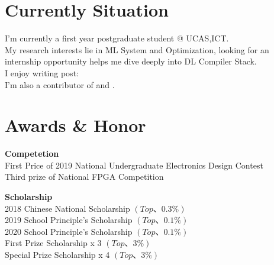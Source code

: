 \documentclass[a4paper,10pt]{article}
\begin{document}
\begin{adjustbox}{valign=t}
\begin{minipage}{0.6\textwidth} %
\section*{Currently Situation}
\begin{description}
	\raggedright
	\item I'm currently a first year postgraduate student @ UCAS,ICT.\\
	My research interests lie in ML System and Optimization, looking for an internship opportunity helps me dive deeply into DL Compiler Stack. \\
	I enjoy writing post: \\
	I'm also a contributor of  and .

\end{description}

\section*{Awards \& Honor}
\begin{description}
\raggedright
\item [] \textbf{Competetion} \\
	First Price of 2019 National Undergraduate Electronics Design Contest \\
	Third prize of National FPGA Competition \\
	\item [] \textbf{Scholarship} \\
	2018 Chinese National Scholarship $\left( Top 、 0.3 \% \right)$ \\
	2019 School Principle's Scholarship $\left( Top 、 0.1 \% \right)$ \\
	2020 School Principle's Scholarship $\left( Top 、 0.1 \% \right)$ \\
	First Prize Scholarship x 3 $\left( Top 、 3 \% \right)$ \\
	Special Prize Scholarship x 4 $\left( Top 、 3 \% \right)$ 


\end{description}


\end{minipage}
\end{adjustbox}
\end{document}
